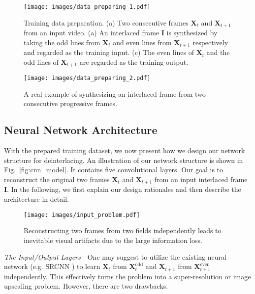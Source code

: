 \documentclass[acmtog]{acmart}
\begin{document}
\begin{figure}[!tp]
	\texttt{[image: images/data\_preparing\_1.pdf]}\\
	\caption{Training data preparation. (a) Two consecutive frames $\mathbf{X}_t$ and $\mathbf{X}_{t+1}$ from an input video. (a) An interlaced frame $\mathbf{I}$ is synthesized by taking the odd lines from $\mathbf{X}_t$ and even lines from $\mathbf{X}_{t+1}$ respectively and regarded as the training input. (c) The even lines of $\mathbf{X}_t$ and the odd lines of $\mathbf{X}_{t+1}$ are regarded as the training output.}\label{fig:data_preparing}
\end{figure}\begin{figure}[!tp]
	\texttt{[image: images/data\_preparing\_2.pdf]}\\
	\caption{A real example of synthesizing an interlaced frame from two consecutive progressive frames.}\label{fig:data_preparing_real}
\end{figure}\subsection{Neural Network Architecture}

With the prepared training dataset, we now present how we design our network
structure for deinterlacing. An illustration of our network structure is shown
in Fig.~\ref{fig:cnn_model}. It contains five convolutional layers. Our goal is
to reconstruct the original two frames $\mathbf{X}_t$ and $\mathbf{X}_{t+1}$
from an input interlaced frame $\mathbf{I}$. In the following, we first explain
our  design rationales and then describe the architecture in
detail.

\begin{figure}[!tp]
	\centering
	\texttt{[image: images/input\_problem.pdf]}\\
	\caption{Reconstructing two frames from two fields independently leads to inevitable visual artifacts due to the large information loss.}\label{fig:input_problem}
\end{figure}\vspace{0.15in}\noindent\emph{The Input/Output Layers}\,\,\,\,%
One may suggest to utilize the existing neural network (e.g. SRCNN
\cite{dong2016image}) to learn $\mathbf{X}_t$ from
$\mathbf{X}^{\text{odd}}_{t}$ and $\mathbf{X}_{t+1}$ from
$\mathbf{X}^{\text{even}}_{t+1}$ independently. This effectively turns the problem into 
a super-resolution or image upscaling problem.
However, there are two drawbacks.
\end{document}
